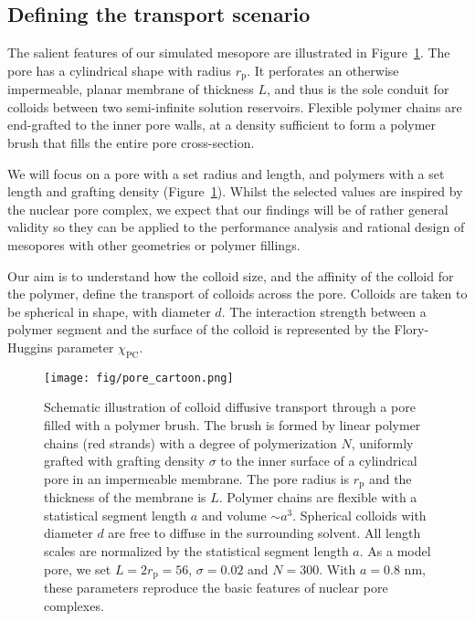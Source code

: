 \documentclass[12pt, a4paper]{article}
\begin{document}
\subsection{Defining the transport scenario}

The salient features of our simulated mesopore are illustrated in Figure~\ref{fig:colloid_transport}.
The pore has a cylindrical shape with radius $r_{\text{p}}$.
It perforates an otherwise impermeable, planar membrane of thickness $L$, and thus is the sole conduit for colloids between two semi-infinite solution reservoirs.
Flexible polymer chains are end-grafted to the inner pore walls, at a density sufficient to form a polymer brush that fills the entire pore cross-section.

We will focus on a pore with a set radius and length, and polymers with a set length and grafting density (Figure~\ref{fig:colloid_transport}).
Whilst the selected values are inspired by the nuclear pore complex, we expect that our findings will be of rather general validity so they can be applied to the performance analysis and rational design of mesopores with other geometries or polymer fillings.

Our aim is to understand how the colloid size, and the affinity of the colloid for the polymer, define the transport of colloids across the pore.
Colloids are taken to be spherical in shape, with diameter $d$.
The interaction strength between a polymer segment and the surface of the colloid is represented by the Flory-Huggins parameter $\chi_{\text{PC}}$.

\begin{figure}
    \centering
    \texttt{[image: fig/pore\_cartoon.png]}
    \caption{
        Schematic illustration of colloid diffusive transport through a pore filled with a polymer brush. 
        The brush is formed by linear polymer chains (red strands) with a degree of polymerization $N$, uniformly grafted with grafting density $\sigma$ 
        to the inner surface of a cylindrical pore in an impermeable membrane.
        The pore radius is $r_{\text{p}}$ and the thickness of the membrane is $L$.
        Polymer chains are flexible with a statistical segment length $a$ and volume $\sim a^3$. 
        Spherical colloids with diameter $d$ are free to diffuse in the surrounding solvent.
        All length scales are normalized by the statistical segment length $a$.
        As a model pore, we set $L = 2r_{\text{p}} = 56$, $\sigma = 0.02$ and $N = 300$.
        With $a = 0.8 {\text{ nm}}$, these parameters reproduce the basic features of nuclear pore complexes.
          }
    \label{fig:colloid_transport}
\end{figure}
\end{document}
